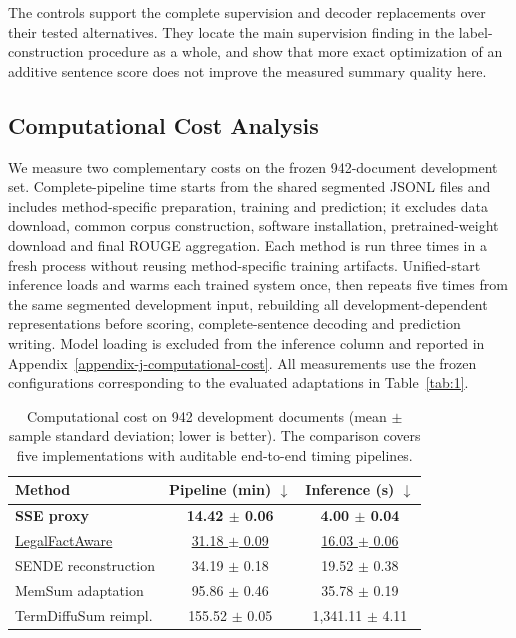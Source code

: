 \documentclass[10pt,twocolumn,letterpaper]{article}
\begin{document}
The controls support the complete supervision and decoder replacements over their tested alternatives. They locate the main supervision finding in the label-construction procedure as a whole, and show that more exact optimization of an additive sentence score does not improve the measured summary quality here.

\subsection{Computational Cost Analysis}\label{computational-cost-analysis}
We measure two complementary costs on the frozen 942-document development set. Complete-pipeline time starts from the shared segmented JSONL files and includes method-specific preparation, training and prediction; it excludes data download, common corpus construction, software installation, pretrained-weight download and final ROUGE aggregation. Each method is run three times in a fresh process without reusing method-specific training artifacts. Unified-start inference loads and warms each trained system once, then repeats five times from the same segmented development input, rebuilding all development-dependent representations before scoring, complete-sentence decoding and prediction writing. Model loading is excluded from the inference column and reported in Appendix~\ref{appendix-j-computational-cost}. All measurements use the frozen configurations corresponding to the evaluated adaptations in Table~\ref{tab:1}.

\begin{table}[t]
\caption{Computational cost on 942 development documents (mean $\pm$ sample standard deviation; lower is better). The comparison covers five implementations with auditable end-to-end timing pipelines.}\label{tab:cost}
\footnotesize
\begin{tabular*}{\columnwidth}{@{\extracolsep{\fill}}lcc@{}}
\toprule
\textbf{Method} & \textbf{Pipeline (min) $\downarrow$} & \textbf{Inference (s) $\downarrow$} \\
\midrule
\textbf{SSE proxy} & \textbf{14.42 $\pm$ 0.06} & \textbf{4.00 $\pm$ 0.04} \\
\underline{LegalFactAware} & \underline{31.18 $\pm$ 0.09} & \underline{16.03 $\pm$ 0.06} \\
SENDE reconstruction & 34.19 $\pm$ 0.18 & 19.52 $\pm$ 0.38 \\
MemSum adaptation & 95.86 $\pm$ 0.46 & 35.78 $\pm$ 0.19 \\
TermDiffuSum reimpl. & 155.52 $\pm$ 0.05 & 1,341.11 $\pm$ 4.11 \\
\bottomrule
\end{tabular*}
\end{table}
\end{document}
